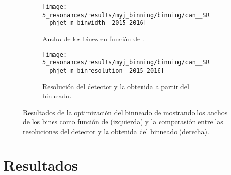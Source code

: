 \begin{figure}[ht!]
    \centering
    \begin{subfigure}[t]{0.49\linewidth}
        \centering
        \texttt{[image: 5\_resonances/results/myj\_binning/binning/can\_\_SR\_\_phjet\_m\_binwidth\_\_2015\_2016]}
        \caption{Ancho de los bines en función de \myj.}
        \label{fig:bkg_modeling:observable:results:binwidth}
    \end{subfigure}
    \hfill
    \begin{subfigure}[t]{0.49\linewidth}
        \centering
        \texttt{[image: 5\_resonances/results/myj\_binning/binning/can\_\_SR\_\_phjet\_m\_binresolution\_\_2015\_2016]}
        \caption{Resolución del detector y la obtenida a partir del binneado.}
        \label{fig:bkg_modeling:observable:results:resolution_comparison}
    \end{subfigure}
    \caption{Resultados de la optimización del binneado de \myj mostrando los anchos de los bines como función de \myj (izquierda) y la comparasión entre las resoluciones del detector y la obtenida del binneado (derecha).}
    \label{fig:bkg_modeling:observable:results}
\end{figure}



























\section{Resultados}
\label{sec:results:results}

